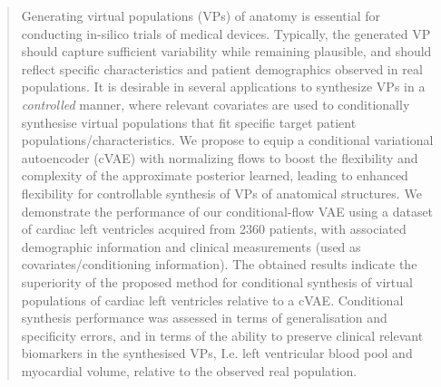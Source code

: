 \documentclass[runningheads]{llncs}
\begin{document}
\begin{abstract}
Generating virtual populations (VPs) of anatomy is essential for conducting in-silico trials of medical devices. Typically, the generated VP should capture sufficient variability while remaining plausible, and should reflect specific characteristics and patient demographics observed in real populations. It is desirable in several applications to synthesize VPs in a \textit{controlled} manner, where relevant covariates are used to conditionally synthesise virtual populations that fit specific target patient populations/characteristics. %
We propose to equip a conditional variational autoencoder (cVAE) with normalizing flows to boost the flexibility and complexity of the approximate posterior learned, leading to enhanced flexibility for controllable synthesis of VPs of anatomical structures. We demonstrate the performance of our conditional-flow VAE using a dataset of cardiac left ventricles acquired from 2360 patients, with associated demographic information and clinical measurements (used as covariates/conditioning information). %
The obtained results indicate the superiority of the proposed method for conditional synthesis of virtual populations of cardiac left ventricles relative to a cVAE. Conditional synthesis performance was assessed in terms of generalisation and specificity errors, and in terms of the ability to preserve clinical relevant biomarkers in the synthesised VPs, I.e. left ventricular blood pool and myocardial volume, relative to the observed real population.%
\end{abstract}
%
%
%
\end{document}
